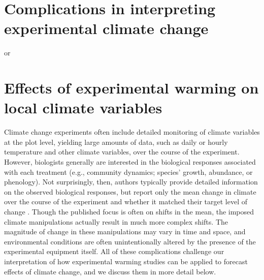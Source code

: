 \documentclass{article}
\begin{document}
\section* {Complications in interpreting experimental climate change}
or 
\section* {Effects of experimental warming on local climate variables}
Climate change experiments often include detailed monitoring of climate variables at the plot level, yielding large amounts of data, such as daily or hourly temperature and other climate variables, over the course of the experiment. However, biologists generally are interested in the biological responses associated with each treatment (e.g., community dynamics; species' growth, abundance, or phenology). Not surprisingly, then, authors typically provide detailed information on the observed biological responses, but report only the mean change in climate over the course of the experiment and whether it matched their target level of change \citep[e.g.][]{price1998,clark2014a,clark2014b,rollinson2012}. Though the published focus is often on shifts in the mean, the imposed climate manipulations actually result in much more complex shifts. The magnitude of change in these manipulations may vary in time and space, and environmental conditions are often unintentionally altered by the presence of the experimental equipment itself. All of these complications challenge our interpretation of how experimental warming studies can be applied to forecast effects of climate change, and we discuss them in more detail below.
\end{document}
